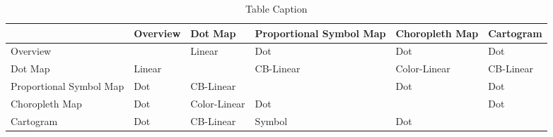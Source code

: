 \begin{table}[!htp]
    \begin{tabular}{M{22mm}||M{22mm} M{22mm} M{22mm} M{22mm} M{22mm}}

    ~                       & Overview & Dot Map & Proportional Symbol Map & Choropleth Map & Cartogram \\[4ex] \hline \hline

    Overview                & ~        & Linear       & Dot                       & Dot              & Dot         \\[4ex]

    Dot Map                 & Linear        & ~       & CB-Linear                       & Color-Linear              & CB-Linear         \\[4ex]

    Proportional Symbol Map & Dot        & CB-Linear       & ~                       & Dot              & Dot         \\[4ex]

    Choropleth Map          & Dot        & Color-Linear       & Dot                       & ~              & Dot         \\[4ex]

    Cartogram               & Dot        & CB-Linear       & Symbol                       & Dot              & ~         \\[4ex]
    \end{tabular}
    \caption {Table Caption}
\end{table}









